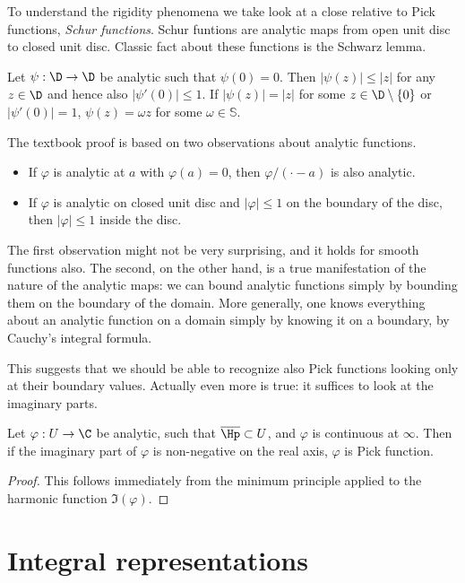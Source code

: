 To understand the rigidity phenomena we take look at a close relative to Pick functions, \textit{Schur functions}. Schur funtions are analytic maps from open unit disc to closed unit disc. Classic fact about these functions is the Schwarz lemma.

\begin{lause}
	Let $\psi : \D \to \D$ be analytic such that $\psi(0) = 0$. Then $|\psi(z)| \leq |z|$ for any $z \in \D$ and hence also $|\psi'(0)| \leq 1$. If $|\psi(z)| = |z|$ for some $z \in \D \setminus \{0\}$ or $|\psi'(0)| = 1$, $\psi(z) = \omega z$ for some $\omega \in \mathbb{S}$.
\end{lause}

The textbook proof is based on two observations about analytic functions.
\begin{itemize}
	\item If $\varphi$ is analytic at $a$ with $\varphi(a) = 0$, then $\varphi/(\cdot - a)$ is also analytic.
	\item If $\varphi$ is analytic on closed unit disc and $|\varphi| \leq 1$ on the boundary of the disc, then $|\varphi| \leq 1$ inside the disc.
\end{itemize}

The first observation might not be very surprising, and it holds for smooth functions also. The second, on the other hand, is a true manifestation of the nature of the analytic maps: we can bound analytic functions simply by bounding them on the boundary of the domain. More generally, one knows everything about an analytic function on a domain simply by knowing it on a boundary, by Cauchy's integral formula.

This suggests that we should be able to recognize also Pick functions looking only at their boundary values. Actually even more is true: it suffices to look at the imaginary parts.

\begin{prop}
	Let $\varphi : U \to \C$ be analytic, such that $\overline{\Hp} \subset U$, and $\varphi$ is continuous at $\infty$. Then if the imaginary part of $\varphi$ is non-negative on the real axis, $\varphi$ is Pick function.
\end{prop}
\begin{proof}
	This follows immediately from the minimum principle applied to the harmonic function $\Im(\varphi)$.
\end{proof}

\section{Integral representations}

